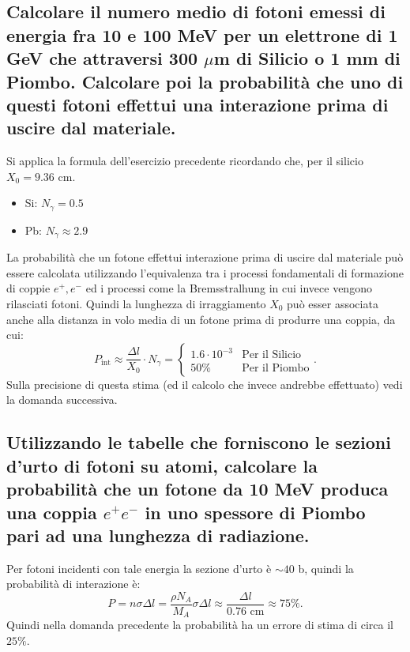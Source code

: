 \subsection[\hspace{1mm} Fotoni emessi da un elettrone nel silicio, probabilita che uno di questi interagisca successivamente]{Calcolare il numero medio di fotoni emessi di energia fra 10 e 100 MeV per un elettrone di 1 GeV che attraversi 300 $\mu$m di Silicio o 1 mm di Piombo. Calcolare poi la probabilità che uno di questi fotoni effettui una interazione prima di uscire dal materiale.
}
\label{sec:4.b.12}
Si applica la formula dell'esercizio precedente ricordando che, per il silicio $X_0 = 9.36$ cm.
\begin{itemize}
	\item Si: $N_{\gamma}= 0.5$
	\item Pb: $N_{\gamma}\approx 2.9$
\end{itemize}
La probabilità che un fotone effettui interazione prima di uscire dal materiale può essere calcolata utilizzando l'equivalenza tra i processi fondamentali di formazione di coppie $e^+, e^-$ ed i processi come la Bremsstralhung in cui invece vengono rilasciati fotoni.
Quindi la lunghezza di irraggiamento $X_0$ può esser associata anche alla distanza in volo media di un fotone prima di produrre una coppia, da cui:
 \[
	P_{\text{int}}\approx \frac{\Delta l}{X_0}\cdot N_{\gamma} =
	\begin{cases}
		1.6 \cdot 10^{-3} & \text{Per il Silicio}\\
		50\% &\text{Per il Piombo}
	\end{cases}
.\] 
Sulla precisione di questa stima (ed il calcolo che invece andrebbe effettuato) vedi la domanda successiva.

\subsection[\hspace{1mm} Probabilità di avere produzione di coppie su piombo]{Utilizzando le tabelle che forniscono le sezioni d'urto di fotoni su atomi, calcolare la probabilità che un fotone da 10 MeV produca una coppia $e^+e^-$ in uno spessore di Piombo pari ad una lunghezza di radiazione.
}\label{sec:4.b.13}
Per fotoni incidenti con tale energia la sezione d'urto è $\sim 40$ b, quindi la probabilità di interazione è:
\[
	P = n \sigma \Delta l = \frac{\rho N_A}{M_A}\sigma \Delta l \approx \frac{\Delta l}{0.76 \text{ cm}} \approx 75 \%
.\] 
Quindi nella domanda precedente la probabilità ha un errore di stima di circa il $25 \%$.

